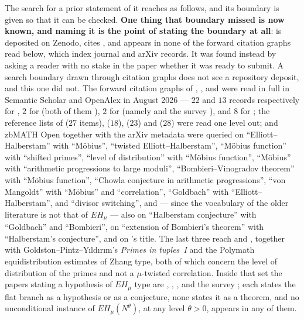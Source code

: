 \documentclass[11pt,a4paper]{article}
\theoremstyle{plain}
\theoremstyle{definition}
\theoremstyle{remark}
\begin{document}
The search for a prior statement of it reaches as follows, and its
boundary is given so that it can be checked. \textbf{One thing that
boundary missed is now known, and naming it is the point of stating
the boundary at all}: \cite{Moya} is deposited on Zenodo, cites
\cite{HL}, and appears in none of the forward citation graphs read
below, which index journal and arXiv records. It was found instead by
asking a reader with no stake in the paper whether it was ready to
submit. A search boundary drawn through citation graphs does not see a
repository deposit, and this one did not. The forward citation
graphs of \cite{MV17}, \cite{Vat19}, \cite{HL} and \cite{LiSP} were
read in full in Semantic Scholar and OpenAlex in August 2026 --- $22$
and $13$ records respectively for \cite{MV17}, $2$ for \cite{Vat19}
(both of them \cite{HL}), $2$ for \cite{HL} (namely \cite{Can} and the
survey \cite{HLi}), and $8$ for \cite{LiSP}; the reference lists of
\cite{MV17} ($27$ items), \cite{HL} ($18$), \cite{Vat19} ($23$) and
\cite{Can} ($28$) were read one level out; and zbMATH Open together
with the arXiv metadata were queried on ``Elliott--Halberstam'' with
``M\"obius'', ``twisted Elliott--Halberstam'', ``M\"obius function''
with ``shifted primes'', ``level of distribution'' with ``M\"obius
function'', ``M\"obius'' with ``arithmetic progressions to large
moduli'', ``Bombieri--Vinogradov theorem'' with ``M\"obius function'',
``Chowla conjecture in arithmetic progressions'', ``von Mangoldt''
with ``M\"obius'' and ``correlation'', ``Goldbach'' with
``Elliott--Halberstam'', and ``divisor switching'', and --- since the
vocabulary of the older literature is not that of $EH_\mu$ --- also on
``Halberstam conjecture'' with ``Goldbach'' and ``Bombieri'', on
``extension of Bombieri's theorem'' with ``Halberstam's conjecture'',
and on \cite{Pan}'s title. The last three reach \cite{Shiu} and
\cite{Pan}, together with Goldston--Pintz--Y{\i}ld{\i}r{\i}m's
\emph{Primes in tuples~I} and the Polymath equidistribution estimates
of Zhang type, both of which concern the level of distribution of the
primes and not a $\mu$-twisted correlation. Inside that set the papers
stating a hypothesis of $EH_\mu$ type are \cite{MV17}, \cite{Vat19},
\cite{HL}, \cite{Can} and the survey \cite{HLi}; each states the flat
branch as a hypothesis or as a conjecture, none states it as a
theorem, and no unconditional instance of $EH_\mu(N^{\theta})$, at any
level $\theta>0$, appears in any of them.
\end{document}
